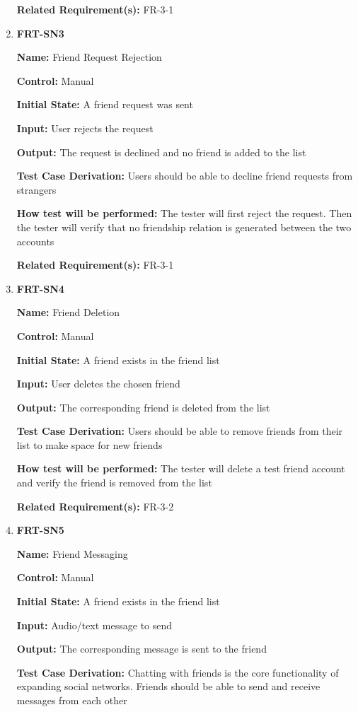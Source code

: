 \documentclass[12pt, titlepage]{article}
\begin{document}
\begin{enumerate}
\textbf{Related Requirement(s):} FR-3-1

\item{\textbf{FRT-SN3}}

\textbf{Name:} Friend Request Rejection

\textbf{Control:} Manual
					
\textbf{Initial State:} A friend request was sent

\textbf{Input:} User rejects the request
					
\textbf{Output:} The request is declined and no friend is added to the list

\textbf{Test Case Derivation:} Users should be able to decline friend requests from strangers
					
\textbf{How test will be performed:} The tester will first reject the request. Then the tester will verify that no friendship relation is generated between the two accounts

\textbf{Related Requirement(s):} FR-3-1

\item{\textbf{FRT-SN4}}

\textbf{Name:} Friend Deletion

\textbf{Control:} Manual
					
\textbf{Initial State:} A friend exists in the friend list

\textbf{Input:} User deletes the chosen friend
					
\textbf{Output:} The corresponding friend is deleted from the list

\textbf{Test Case Derivation:} Users should be able to remove friends from their list to make space for new friends
					
\textbf{How test will be performed:} The tester will delete a test friend account and verify the friend is removed from the list

\textbf{Related Requirement(s):} FR-3-2

\item{\textbf{FRT-SN5}}

\textbf{Name:} Friend Messaging

\textbf{Control:} Manual
					
\textbf{Initial State:} A friend exists in the friend list

\textbf{Input:} Audio/text message to send
					
\textbf{Output:} The corresponding message is sent to the friend

\textbf{Test Case Derivation:} Chatting with friends is the core functionality of expanding social networks. Friends should be able to send and receive messages from each other
					

\end{enumerate}
\end{document}
